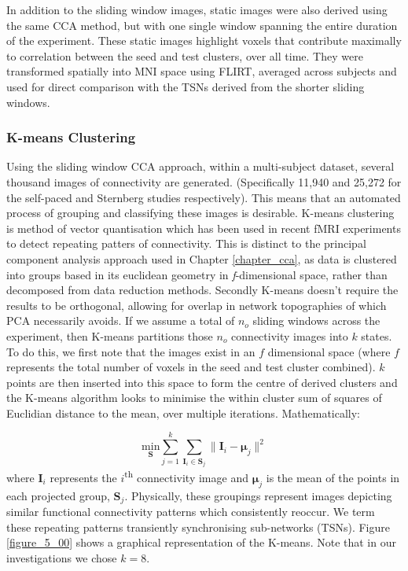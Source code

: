 In addition to the sliding window images, static images were also derived using the same CCA method, but with one single window spanning the entire duration of the experiment. These static images highlight voxels that contribute maximally to correlation between the seed and test clusters, over all time. They were transformed spatially into MNI space using FLIRT, averaged across subjects and used for direct comparison with the TSNs derived from the shorter sliding windows.

\subsubsection{K-means Clustering}
Using the sliding window CCA approach, within a multi-subject dataset, several thousand images of connectivity are generated. (Specifically 11,940 and 25,272 for the self-paced and Sternberg studies respectively). This means that an automated process of grouping and classifying these images is desirable. K-means clustering \citep{MacQueen1967} is method of vector quantisation which has been used in recent fMRI experiments \citep{Allen2014,Liu2013} to detect repeating patters of connectivity. This is distinct to the principal component analysis approach used in Chapter \ref{chapter_cca}, as data is clustered into groups based in its euclidean geometry in \textit{f}-dimensional space, rather than decomposed from data reduction methods. Secondly K-means doesn't require the results to be orthogonal, allowing for overlap in network topographies of which PCA  necessarily avoids. If we assume a total of $n_o$ sliding windows across the experiment, then K-means partitions those $n_o$ connectivity images into $k$ states. To do this, we first note that the images exist in an $f$ dimensional space (where $f$ represents the total number of voxels in the seed and test cluster combined). $k$ points are then inserted into this space to form the centre of derived clusters and the K-means algorithm looks to minimise the within cluster sum of squares of Euclidian distance to the mean, over multiple iterations. Mathematically: 

\begin{equation}
\underset{\mathbf{S}}{\text{min}} \sum_{j=1}^{k} \sum_{\mathbf{I}_i \in \mathbf{S}_j}\parallel\mathbf{I}_i - \mathbf{\mu}_j\parallel^2 \label{eqn_5_1}
\end{equation} where $\mathbf{I}_i$ represents the  $i$\textsuperscript{th} connectivity image and $\mathbf{\mu}_j$ is the mean of the points in each projected group, $\mathbf{S}_j$. Physically, these groupings represent images depicting similar functional connectivity patterns which consistently reoccur. We term these repeating patterns transiently synchronising sub-networks (TSNs). Figure \ref{figure_5_00} shows a graphical representation of the K-means. Note that in our investigations we chose $k=8$.


